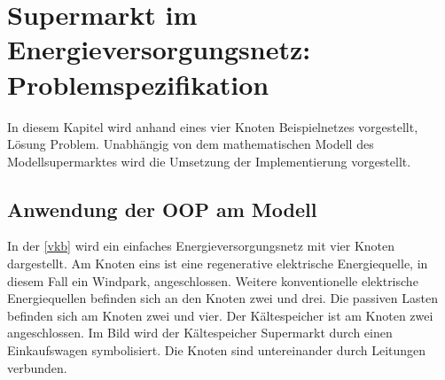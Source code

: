 \chapter{Supermarkt im Energieversorgungsnetz: Problemspezifikation}
\label{chap:SEVN}
\minitoc

In diesem Kapitel wird anhand eines vier Knoten Beispielnetzes vorgestellt, Lösung Problem. Unabhängig von dem mathematischen Modell des Modellsupermarktes wird die Umsetzung der Implementierung
vorgestellt.



\section{Anwendung der OOP am Modell}
In der \cref{vkb} wird ein einfaches Energieversorgungsnetz mit vier Knoten dargestellt. Am Knoten eins ist eine regenerative
elektrische Energiequelle, in diesem Fall ein Windpark, angeschlossen. Weitere konventionelle elektrische Energiequellen
befinden sich an den Knoten zwei und drei. Die passiven Lasten befinden sich am Knoten zwei und vier. Der Kältespeicher ist am
Knoten zwei angeschlossen. Im Bild wird der Kältespeicher Supermarkt durch einen Einkaufswagen symbolisiert. Die Knoten sind
untereinander durch Leitungen verbunden.

